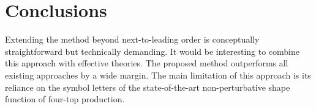 \section{Conclusions}\label{sec:conclusions}

Extending the method beyond next-to-leading order is conceptually
straightforward but technically demanding. It would be interesting to
combine this approach with effective theories. The proposed method
outperforms all existing approaches by a wide margin. The main
limitation of this approach is its reliance on the symbol letters of the
state-of-the-art non-perturbative shape function of four-top production.

